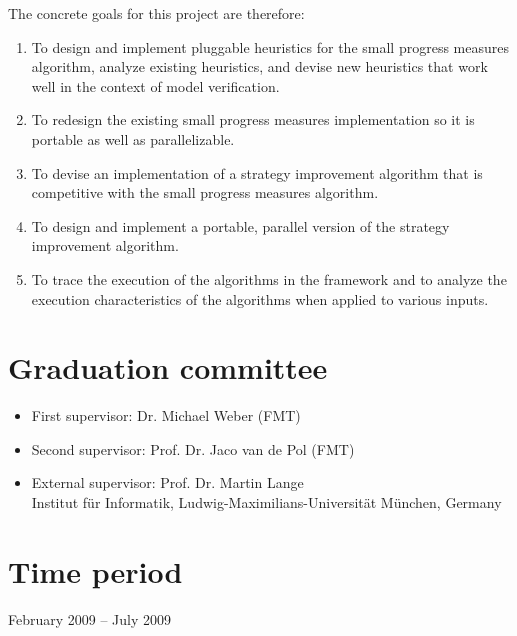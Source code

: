 \documentclass[11pt]{article}
\begin{document}
The concrete goals for this project are therefore:
\begin{enumerate}
\item To design and implement pluggable heuristics for the small progress measures
      algorithm, analyze existing heuristics, and devise new heuristics that
      work well in the context of model verification.
\item To redesign the existing small progress measures implementation so it is
      portable as well as parallelizable.
\item To devise an implementation of a strategy improvement algorithm that is
      competitive with the small progress measures algorithm.
\item To design and implement a portable, parallel version of the strategy
      improvement algorithm.
\item To trace the execution of the algorithms in the framework and to analyze
      the execution characteristics of the algorithms when applied to various
      inputs.
\end{enumerate}

\section{Graduation committee}
\begin{itemize}
\item First supervisor: Dr. Michael Weber (FMT)
\item Second supervisor: Prof. Dr. Jaco van de Pol (FMT)
\item External supervisor: Prof. Dr. Martin Lange\\
  Institut f\"ur Informatik,
  Ludwig-Maximilians-Universit\"at M\"unchen, Germany
\end{itemize}

\section{Time period}
February 2009 -- July 2009



\end{document}
